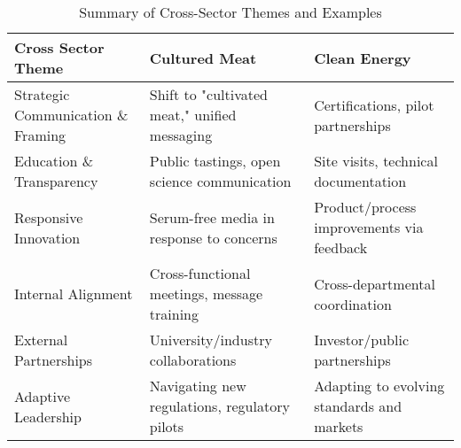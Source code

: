 \begin{table}[h!]
	\centering
	\caption{Summary of Cross-Sector Themes and Examples}
	\label{tab:cross_sector_summary}
	\begin{tabularx}{\textwidth}{@{}lXX@{}}
		\toprule
		\textbf{Cross Sector Theme} & \textbf{Cultured Meat} & \textbf{Clean Energy} \\
		\midrule
		Strategic Communication \& Framing & Shift to "cultivated meat," unified messaging & Certifications, pilot partnerships \\
		\addlinespace
		Education \& Transparency & Public tastings, open science communication & Site visits, technical documentation \\
		\addlinespace
		Responsive Innovation & Serum-free media in response to concerns & Product/process improvements via feedback \\
		\addlinespace
		Internal Alignment & Cross-functional meetings, message training & Cross-departmental coordination \\
		\addlinespace
		External Partnerships & University/industry collaborations & Investor/public partnerships \\
		\addlinespace
		Adaptive Leadership & Navigating new regulations, regulatory pilots & Adapting to evolving standards and markets \\
		\bottomrule
	\end{tabularx}
\end{table}
